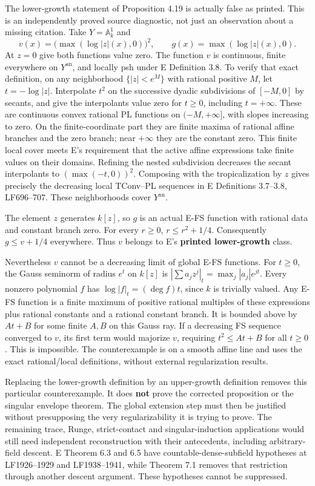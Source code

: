\documentclass[
  10pt,
]{article}
\begin{document}
The lower-growth statement of Proposition 4.19 is actually false as
printed. This is an independently proved source diagnostic, not just an
observation about a missing citation. Take \(Y=\mathbb A^1_k\) and \[
             v(x)=\big(\max(\log|z|(x),0)\big)^2,
             \qquad g(x)=\max(\log|z|(x),0).                           \tag{31}
\] At \(z=0\) give both functions value zero. The function \(v\) is
continuous, finite everywhere on \(Y^{\mathrm{an}}\), and locally psh
under E Definition 3.8. To verify that exact definition, on any
neighborhood \(\{|z|<e^M\}\) with rational positive \(M\), let
\(t=-\log|z|\). Interpolate \(t^2\) on the successive dyadic
subdivisions of \([-M,0]\) by secants, and give the interpolants value
zero for \(t\geq0\), including \(t=+\infty\). These are continuous
convex rational PL functions on \((-M,+\infty]\), with slopes increasing
to zero. On the finite-coordinate part they are finite maxima of
rational affine branches and the zero branch; near \(+\infty\) they are
the constant zero. This finite local cover meets E's requirement that
the active affine expressions take finite values on their domains.
Refining the nested subdivision decreases the secant interpolants to
\((\max(-t,0))^2\). Composing with the tropicalization by \(z\) gives
precisely the decreasing local TConv--PL sequences in E Definitions
3.7--3.8, LF696--707. These neighborhoods cover \(Y^{\mathrm{an}}\).

The element \(z\) generates \(k[z]\), so \(g\) is an actual E-FS
function with rational data and constant branch zero. For every
\(r\geq0\), \(r\leq r^2+1/4\). Consequently \(g\leq v+1/4\) everywhere.
Thus \(v\) belongs to E's \textbf{printed lower-growth} class.

Nevertheless \(v\) cannot be a decreasing limit of global E-FS
functions. For \(t\geq0\), the Gauss seminorm of radius \(e^t\) on
\(k[z]\) is \(|\sum a_jz^j|_t=\max_j |a_j|e^{jt}\). Every nonzero
polynomial \(f\) has \(\log|f|_t=(\deg f)t\), since \(k\) is trivially
valued. Any E-FS function is a finite maximum of positive rational
multiples of these expressions plus rational constants and a rational
constant branch. It is bounded above by \(At+B\) for some finite \(A,B\)
on this Gauss ray. If a decreasing FS sequence converged to \(v\), its
first term would majorize \(v\), requiring \(t^2\leq At+B\) for all
\(t\geq0\). This is impossible. The counterexample is on a smooth affine
line and uses the exact rational/local definitions, without external
regularization results.

Replacing the lower-growth definition by an upper-growth definition
removes this particular counterexample. It does \textbf{not} prove the
corrected proposition or the singular envelope theorem. The global
extension step must then be justified without presupposing the very
regularizability it is trying to prove. The remaining trace, Runge,
strict-contact and singular-induction applications would still need
independent reconstruction with their antecedents, including
arbitrary-field descent. E Theorem 6.3 and 6.5 have
countable-dense-subfield hypotheses at LF1926--1929 and LF1938--1941,
while Theorem 7.1 removes that restriction through another descent
argument. These hypotheses cannot be suppressed.
\end{document}
